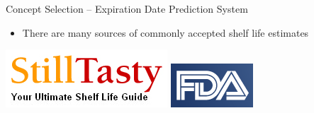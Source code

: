\documentclass[t]{beamer}
\begin{document}
\begin{frame}{Concept Selection -- Expiration Date Prediction System}
\begin{itemize}
\item There are many sources of commonly accepted shelf life estimates
\end{itemize}
\begin{center}
\includegraphics[scale=0.6]{../Graphics/stillTasty}
\newline
\vspace{1.0cm}
\newline
\includegraphics[scale=0.6]{../Graphics/fda}
\end{center}
\end{frame}
\end{document}
